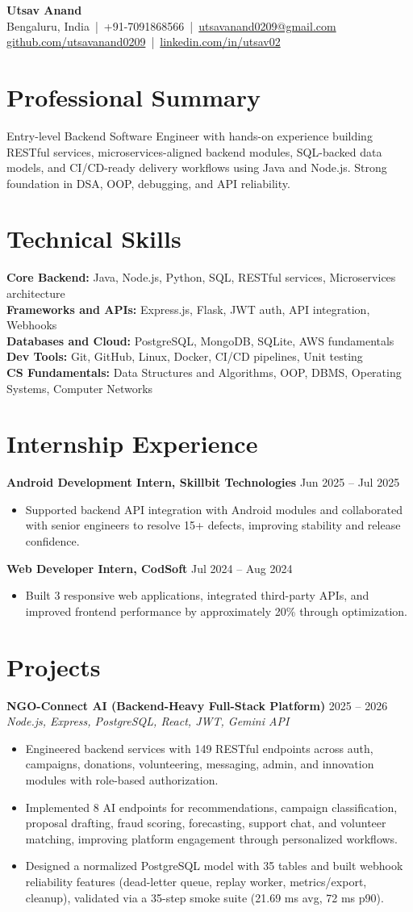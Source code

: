 \documentclass[10pt]{article}
\newcommand{\resheading}[1]{\section*{#1}}
\newcommand{\resitem}[1]{\item #1}
\newcommand{\resproject}[3]{\textbf{#1} \hfill #2\\\textit{#3}}
\begin{document}
\begin{center}
    {\LARGE \textbf{Utsav Anand}}\\[3pt]
    Bengaluru, India \,|\, +91-7091868566 \,|\, \href{mailto:utsavanand0209@gmail.com}{utsavanand0209@gmail.com}\\[1pt]
    \href{https://github.com/utsavanand0209}{github.com/utsavanand0209} \,|\, \href{https://www.linkedin.com/in/utsav02/}{linkedin.com/in/utsav02}
\end{center}

\resheading{Professional Summary}
Entry-level Backend Software Engineer with hands-on experience building RESTful services, microservices-aligned backend modules, SQL-backed data models, and CI/CD-ready delivery workflows using Java and Node.js. Strong foundation in DSA, OOP, debugging, and API reliability.

\resheading{Technical Skills}
\textbf{Core Backend:} Java, Node.js, Python, SQL, RESTful services, Microservices architecture\\
\textbf{Frameworks and APIs:} Express.js, Flask, JWT auth, API integration, Webhooks\\
\textbf{Databases and Cloud:} PostgreSQL, MongoDB, SQLite, AWS fundamentals\\
\textbf{Dev Tools:} Git, GitHub, Linux, Docker, CI/CD pipelines, Unit testing\\
\textbf{CS Fundamentals:} Data Structures and Algorithms, OOP, DBMS, Operating Systems, Computer Networks

\resheading{Internship Experience}
\textbf{Android Development Intern, Skillbit Technologies} \hfill Jun 2025 -- Jul 2025
\begin{itemize}
    \resitem{Supported backend API integration with Android modules and collaborated with senior engineers to resolve 15+ defects, improving stability and release confidence.}
\end{itemize}

\textbf{Web Developer Intern, CodSoft} \hfill Jul 2024 -- Aug 2024
\begin{itemize}
    \resitem{Built 3 responsive web applications, integrated third-party APIs, and improved frontend performance by approximately 20\% through optimization.}
\end{itemize}

\resheading{Projects}
\resproject{NGO-Connect AI (Backend-Heavy Full-Stack Platform)}{2025 -- 2026}{Node.js, Express, PostgreSQL, React, JWT, Gemini API}
\begin{itemize}
    \resitem{Engineered backend services with 149 RESTful endpoints across auth, campaigns, donations, volunteering, messaging, admin, and innovation modules with role-based authorization.}
    \resitem{Implemented 8 AI endpoints for recommendations, campaign classification, proposal drafting, fraud scoring, forecasting, support chat, and volunteer matching, improving platform engagement through personalized workflows.}
    \resitem{Designed a normalized PostgreSQL model with 35 tables and built webhook reliability features (dead-letter queue, replay worker, metrics/export, cleanup), validated via a 35-step smoke suite (21.69 ms avg, 72 ms p90).}
\end{itemize}
\end{document}

